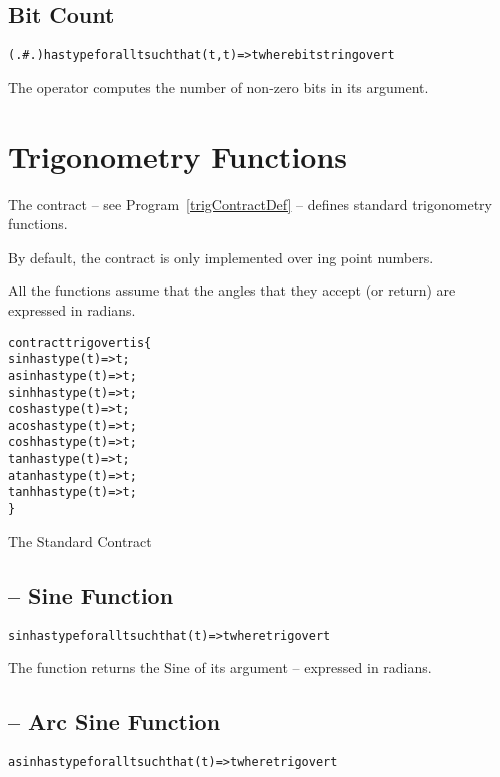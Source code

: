\subsection{ Bit Count}
\label{bitCount}
\begin{alltt}
(.#.) has type for all t such that (t,t)=>t where bitstring over t
\end{alltt}

The  operator computes the number of non-zero bits in its argument.


\section{Trigonometry Functions}
\label{trigContract}
The  contract -- see Program~\vref{trigContractDef} -- defines standard trigonometry functions.

\begin{aside}
By default, the  contract is only implemented over ing point numbers.
\end{aside}

\begin{aside}
All the  functions assume that the angles that they accept (or return) are expressed in radians.
\end{aside}

\begin{program}
\begin{alltt}
contract trig over t is \{
  sin has type (t)=>t;
  asin has type (t)=>t;
  sinh has type (t)=>t;
  cos has type (t)=>t;
  acos has type (t)=>t;
  cosh has type (t)=>t;
  tan has type (t)=>t;
  atan has type (t)=>t;
  tanh has type (t)=>t;
\}
\end{alltt}
\caption{The Standard  Contract\label{trigContractDef}}
\end{program}

\subsection{ -- Sine Function}
\begin{alltt}
sin has type for all t such that (t)=>t where trig over t
\end{alltt}

The  function returns the Sine of its argument -- expressed in radians.

\subsection{ -- Arc Sine Function}
\begin{alltt}
asin has type for all t such that (t)=>t where trig over t
\end{alltt}

